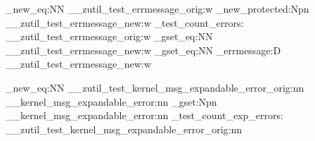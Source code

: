 


\cs_new_eq:NN \__zutil_test_errmessage_orig:w \errmessage
\cs_new_protected:Npn \__zutil_test_errmessage_new:w
  {
    \zutil_test_count_errors:
    \__zutil_test_errmessage_orig:w
  }
\cs_gset_eq:NN \errmessage       \__zutil_test_errmessage_new:w
\cs_gset_eq:NN \tex_errmessage:D \__zutil_test_errmessage_new:w  %

\cs_new_eq:NN \__zutil_test_kernel_msg_expandable_error_orig:nn
              \__kernel_msg_expandable_error:nn
\cs_gset:Npn \__kernel_msg_expandable_error:nn
  {
    \zutil_test_count_exp_errors:
    \__zutil_test_kernel_msg_expandable_error_orig:nn
  }

\ExplSyntaxOff
